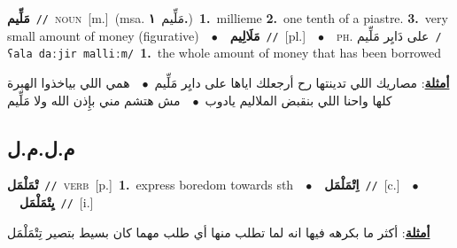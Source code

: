 \documentclass[10pt,a4paper,twoside]{article} %
\begin{document}
\begin{multicols}{2}
{\setlength\topsep{0pt}\textbf{\foreignlanguage{arabic}{مَلِّيم}}\ {\color{gray}\texttt{//}\color{black}}\ \textsc{noun}\ [m.]\ \color{gray}(msa. \foreignlanguage{arabic}{مَلِّيم}~\foreignlanguage{arabic}{\textbf{١.}})\color{black}\ \textbf{1.}~millieme  \textbf{2.}~one tenth of a piastre.  \textbf{3.}~very small amount of money (figurative)\ \ $\bullet$\ \ \setlength\topsep{0pt}\textbf{\foreignlanguage{arabic}{مَلَالِيم}}\ {\color{gray}\texttt{//}\color{black}}\ [pl.]\ \ $\bullet$\ \ \textsc{ph.} \color{gray} \foreignlanguage{arabic}{على دَايِر مَلِّيم}\color{black}\ {\color{gray}\texttt{/{\sffamily ʕala daːjir malliːm}/}\color{black}}\ \textbf{1.}~the whole amount of money that has been borrowed\  \begin{flushright}\color{gray}\foreignlanguage{arabic}{\textbf{\underline{\foreignlanguage{arabic}{أمثلة}}}: مصاريك اللي تدينتها رح أرجعلك اياها على دايِر مَلِّيم\ $\bullet$\ \  همي اللي بياخذوا الهبرة كلها واحنا اللي بنقبض الملاليم يادوب\ $\bullet$\ \  مش هتشم مني بإِذن الله ولا مَلِّيم}\end{flushright}\color{black}} \vspace{2mm}

\vspace{-3mm}
\subsection*{\color{blue}\foreignlanguage{arabic}{م.ل.م.ل}\color{blue}{}} 

{\setlength\topsep{0pt}\textbf{\foreignlanguage{arabic}{تْمَلْمَل}}\ {\color{gray}\texttt{//}\color{black}}\ \textsc{verb}\ [p.]\ \textbf{1.}~express boredom towards sth\ \ $\bullet$\ \ \setlength\topsep{0pt}\textbf{\foreignlanguage{arabic}{اِتْمَلْمَل}}\ {\color{gray}\texttt{//}\color{black}}\ [c.]\ \ $\bullet$\ \ \setlength\topsep{0pt}\textbf{\foreignlanguage{arabic}{يِتْمَلْمَل}}\ {\color{gray}\texttt{//}\color{black}}\ [i.]\  \begin{flushright}\color{gray}\foreignlanguage{arabic}{\textbf{\underline{\foreignlanguage{arabic}{أمثلة}}}: أكثر ما بكرهه فيها انه لما تطلب منها أي طلب مهما كان بسيط بتصير تِتْمَلْمَل}\end{flushright}\color{black}} \vspace{2mm}


\end{multicols}
\end{document}
